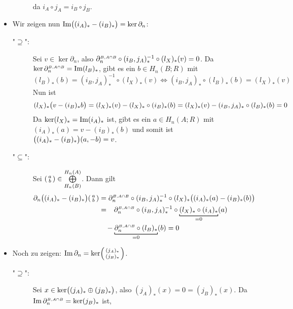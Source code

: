 \begin{itemize}
\begin{description}
\begin{align*}
		\end{align*}
		da $i_A \circ j_A = i_B \circ j_B$. 
	\end{description}
	\item Wir zeigen nun $\im\enbrace[\big]{ (i_A)_* - (i_B)_*} = \ker \partial_n$:
	\begin{description}
		\item["$\supseteq$":] Sei $v \in \ker \partial_n$, also $\rand{B, A\cap B}_n \circ  (i_B,j_A)_*^{-1} \circ (l_X)_*(v)=0$. Da $\ker \rand{B, A\cap B}_n =\im (l_B)_*$,
		gibt es ein $b \in H_n(B;R)$ mit
		\[
			(l_B)_*(b) = (i_B,j_A)_*^{-1} \circ (l_X)_*(v) \iff (i_B,j_A)_* \circ(l_B)_*(b) = (l_X)_*(v)
		\]
		Nun ist
		\[
			(l_X)_* \enbrace[\big]{v- (i_B)_* b} = (l_X)_*(v) - (l_X)_* \circ (i_B)_*(b) = (l_X)_*(v) -(i_B,j_A)_* \circ(l_B)_*(b)=0
		\]
		Da $\ker (l_X)_* = \im (i_A)_*$ ist, gibt es ein $a \in H_n(A;R)$ mit $(i_A)_*(a) = v - (i_B)_* (b)$ und somit ist
		$\enbrace[\big]{(i_A)_* - (i_B)_*}(a,-b) = v$.
		\item["$\subseteq$":] Sei $\begin{psmallmatrix} a \\ b \end{psmallmatrix} \in \bigoplus\limits_{H_n(B)}^{H_n(A)}$. Dann gilt
		\begin{align*}
			\partial_n \enbrace[\big]{(i_A)_* - (i_B)_*}  \begin{psmallmatrix} a \\ b \end{psmallmatrix} 
			&=  \rand{B, A\cap B}_n \circ  (i_B,j_A)_*^{-1} \circ (l_X)_* \enbrace[\big]{(i_A)_*(a)- (i_B)_*(b)}  \\
			&=\hphantom{-} \rand{B, A\cap B}_n \circ  (i_B,j_A)_*^{-1} \circ \underbracket[0.7pt][2pt]{(l_X)_* \circ (i_A)_*}_{=0} (a) \\
			&\,\hphantom{=} -\underbracket[0.7pt][2pt]{\rand{B, A\cap B}_n  \circ (l_B)_*}_{=0} (b) =0
		\end{align*}
	\end{description}
	\item Noch zu zeigen: $\im \partial_n = \ker \begin{psmallmatrix} (j_A)_* \\ (j_B)_* \end{psmallmatrix}$.
	\begin{description}
		\item["$\supseteq$":] Sei $x \in \ker \enbrace[\big]{(j_A)_* \oplus (j_B)_*}$, also $(j_A)_*(x) = 0 = (j_B)_*(x)$. Da $\im \rand{B,A \cap B}_n=\ker (j_B)_*$ ist, 

\end{description}
\end{itemize}
